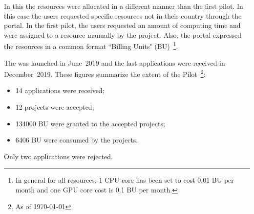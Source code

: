 \newcommand{\BUcons}{6406\xspace}
\newcommand{\BUreq}{134000\xspace}

In this \pilot the resources were allocated in a different manner than the first pilot.
In this case the users requested specific resources not in their country through the portal. 
In the first pilot, the users requested an amount of computing time and were assigned to a resource manually by the \dell project.
Also, the portal expressed the \einfra resources in a common format ``Billing Units" (BU)~\footnote{In general for all \dell resources, 1 CPU core has been set to cost 0.01 BU per month and one GPU core cost is 0.1 BU per month.}.

The \dell \pilot was launched in June~2019 and the last applications were received in December~2019. 
These figures summarize the extent of the Pilot~\footnote{As of \today}:
\begin{itemize}
\item 14 applications were received;
\item 12 projects were accepted;
\item \BUreq BU were granted to the accepted projects;
\item \BUcons BU were consumed by the projects.
\end{itemize}
Only two applications were rejected. 

